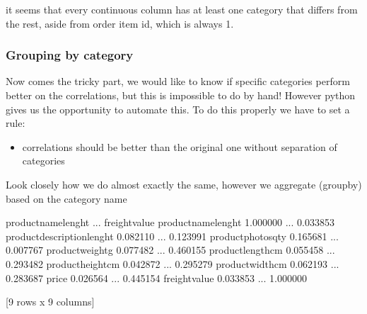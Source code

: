 \documentclass[letterpaper,10pt,english]{jupyterBook}
\begin{document}
\sphinxAtStartPar
it seems that every continuous column has at least one category that differs from the rest, aside from order item id, which is always 1.


\subsubsection{Grouping by category}
\label{\detokenize{c7_case_studies/Olist:grouping-by-category}}
\sphinxAtStartPar
Now comes the tricky part, we would like to know if specific categories perform better on the correlations, but this is impossible to do by hand! However python gives us the opportunity to automate this. To do this properly we have to set a rule:
\begin{itemize}
\item {} 
\sphinxAtStartPar
correlations should be better than the original one without separation of categories

\end{itemize}

\sphinxAtStartPar
Look closely how we do almost exactly the same, however we aggregate (groupby) based on the category name

\begin{sphinxVerbatim}[commandchars=\\\{\}]
\end{sphinxVerbatim}

\begin{sphinxVerbatim}[commandchars=\\\{\}]
                            product\PYGZus{}name\PYGZus{}lenght  ...  freight\PYGZus{}value
product\PYGZus{}name\PYGZus{}lenght                    1.000000  ...       0.033853
product\PYGZus{}description\PYGZus{}lenght             0.082110  ...       0.123991
product\PYGZus{}photos\PYGZus{}qty                     0.165681  ...       0.007767
product\PYGZus{}weight\PYGZus{}g                       0.077482  ...       0.460155
product\PYGZus{}length\PYGZus{}cm                      0.055458  ...       0.293482
product\PYGZus{}height\PYGZus{}cm                     \PYGZhy{}0.042872  ...       0.295279
product\PYGZus{}width\PYGZus{}cm                       0.062193  ...       0.283687
price                                  0.026564  ...       0.445154
freight\PYGZus{}value                          0.033853  ...       1.000000

[9 rows x 9 columns]
\end{sphinxVerbatim}
\end{document}
